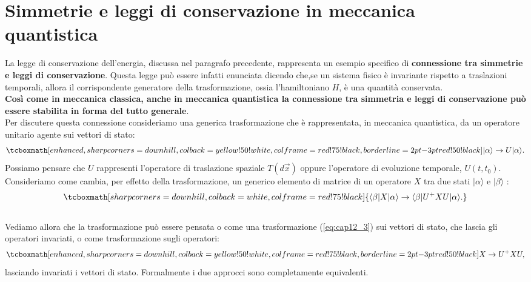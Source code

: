 \section[Simmetrie e leggi di conservazione  in meccanica quantistica]{Simmetrie e leggi di conservazione  in meccanica \\quantistica} 

La legge di conservazione dell'energia, discussa nel paragrafo precedente, rappresenta un esempio specifico di \textbf{connessione tra simmetrie e leggi di conservazione}. Questa legge può essere infatti enunciata dicendo che,se un sistema fisico è invariante rispetto a traslazioni temporali, allora il corrispondente generatore della trasformazione, ossia l'hamiltoniano $H$, è una quantità conservata.\\

\textbf{Così come in meccanica classica, anche in meccanica quantistica la connessione tra simmetria e leggi di conservazione può essere stabilita in forma del tutto generale}.\\

Per discutere questa connessione consideriamo una generica trasformazione che è rappresentata, in meccanica quantistica, da un operatore unitario agente sui vettori di stato:
	\begin{equation}
	\label{eq:cap12_3}
		\tcboxmath[enhanced, sharp corners=downhill, colback=yellow!50!white, colframe=red!75!black, borderline={2pt}{-3pt}{red!50!black}]{
			|\alpha \rangle \rightarrow {U}|\alpha \rangle.
			}
	\end{equation}
Possiamo pensare che ${U}$ rappresenti l'operatore di traslazione spaziale $T(d\vec{x})$ oppure l'operatore di evoluzione temporale, ${U}(t,t_0)$.\\

Consideriamo come cambia, per effetto della trasformazione, un generico elemento di matrice di un operatore ${X}$ tra due stati $|\alpha \rangle$ e $|\beta\rangle$ :
	\begin{equation}
		\tcboxmath[sharp corners=downhill, colback=white, colframe=red!75!black]{
			\langle \beta|{X}|\alpha \rangle   \rightarrow    \langle \beta |{U}^+{X}{U}|\alpha \rangle.
			}
	\end{equation}\\

Vediamo allora che la trasformazione può essere pensata o come una trasformazione (\ref{eq:cap12_3})  sui vettori di stato, che lascia gli operatori invariati, o come trasformazione sugli operatori:
	\begin{equation}
	\label{eq:cap12_4}
		\tcboxmath[enhanced, sharp corners=downhill, colback=yellow!50!white, colframe=red!75!black, borderline={2pt}{-3pt}{red!50!black}]{
		{X}\rightarrow {U}^+ {X}{U},}
	\end{equation}
lasciando invariati i vettori di stato. Formalmente i due approcci sono completamente equivalenti.\\

